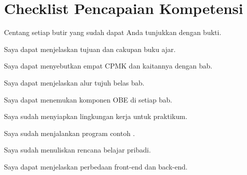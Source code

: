 \section*{Checklist Pencapaian Kompetensi}

Centang setiap butir yang sudah dapat Anda tunjukkan dengan bukti.

\begin{checklist}
  \item Saya dapat menjelaskan tujuan dan cakupan buku ajar.
  \item Saya dapat menyebutkan empat CPMK dan kaitannya dengan bab.
  \item Saya dapat menjelaskan alur tujuh belas bab.
  \item Saya dapat menemukan komponen OBE di setiap bab.
  \item Saya sudah menyiapkan lingkungan kerja untuk praktikum.
  \item Saya sudah menjalankan program contoh .
  \item Saya sudah menuliskan rencana belajar pribadi.
  \item Saya dapat menjelaskan perbedaan front-end dan back-end.
\end{checklist}
